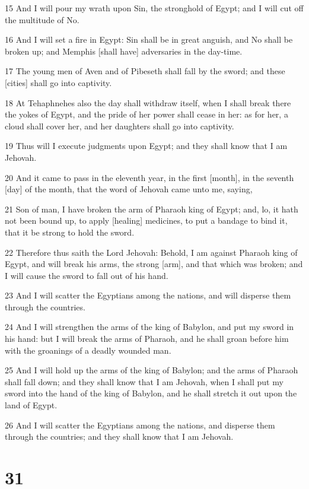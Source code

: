 \par 15 And I will pour my wrath upon Sin, the stronghold of Egypt; and I will cut off the multitude of No.
\par 16 And I will set a fire in Egypt: Sin shall be in great anguish, and No shall be broken up; and Memphis [shall have] adversaries in the day-time.
\par 17 The young men of Aven and of Pibeseth shall fall by the sword; and these [cities] shall go into captivity.
\par 18 At Tehaphnehes also the day shall withdraw itself, when I shall break there the yokes of Egypt, and the pride of her power shall cease in her: as for her, a cloud shall cover her, and her daughters shall go into captivity.
\par 19 Thus will I execute judgments upon Egypt; and they shall know that I am Jehovah.
\par 20 And it came to pass in the eleventh year, in the first [month], in the seventh [day] of the month, that the word of Jehovah came unto me, saying,
\par 21 Son of man, I have broken the arm of Pharaoh king of Egypt; and, lo, it hath not been bound up, to apply [healing] medicines, to put a bandage to bind it, that it be strong to hold the sword.
\par 22 Therefore thus saith the Lord Jehovah: Behold, I am against Pharaoh king of Egypt, and will break his arms, the strong [arm], and that which was broken; and I will cause the sword to fall out of his hand.
\par 23 And I will scatter the Egyptians among the nations, and will disperse them through the countries.
\par 24 And I will strengthen the arms of the king of Babylon, and put my sword in his hand: but I will break the arms of Pharaoh, and he shall groan before him with the groanings of a deadly wounded man.
\par 25 And I will hold up the arms of the king of Babylon; and the arms of Pharaoh shall fall down; and they shall know that I am Jehovah, when I shall put my sword into the hand of the king of Babylon, and he shall stretch it out upon the land of Egypt.
\par 26 And I will scatter the Egyptians among the nations, and disperse them through the countries; and they shall know that I am Jehovah.

\chapter{31}

